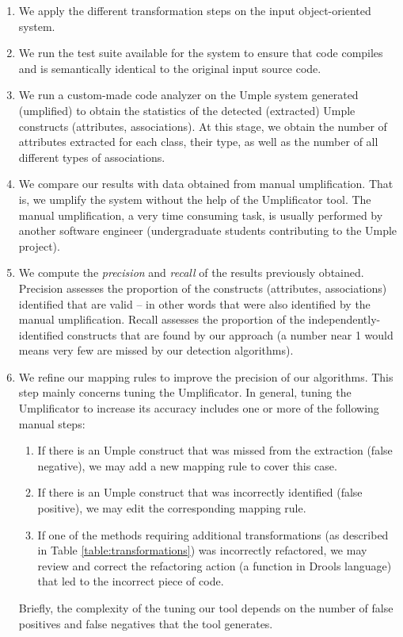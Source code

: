 \begin{enumerate}
\item We apply the different transformation steps on the input object-oriented system.

\item We run the test suite available for the system to ensure that code compiles and is semantically identical to the original input source code.

\item We run a custom-made code analyzer on the Umple system generated (umplified) to obtain the statistics of the detected (extracted) Umple constructs (attributes, associations). At this stage, we obtain the number of attributes extracted for each class, their type, as well as the number of all different types of associations.	

\item We compare our results with data obtained from manual umplification. That is, we umplify the system without the help of the Umplificator tool. The manual 	umplification, a very time consuming task, is usually performed by another software engineer (undergraduate students contributing to the Umple project). 

\item We compute the \textit{precision} and \textit{recall} of the results previously obtained. Precision assesses the proportion of the constructs (attributes, associations) identified that are valid -- in other words that were also identified by the manual umplification. Recall assesses the proportion of the independently-identified constructs that are found by our approach (a number near 1 would means very few are missed by our detection algorithms). 

\item We refine our mapping rules to improve the precision of our algorithms. This step mainly concerns tuning the Umplificator. In general, tuning the Umplificator to increase its accuracy includes one or more of the following manual steps:

	\begin{enumerate}
		\item If there is an Umple construct that was missed from the extraction (false negative), we may add a new mapping rule to cover this case.
		
		\item If there is an Umple construct that was incorrectly identified (false positive), we may edit the corresponding mapping rule.
		\item If one of the methods requiring additional transformations (as described in Table \ref{table:transformations}) was incorrectly refactored, we may review and correct the refactoring action (a function in Drools language) that led to the incorrect piece of code.

	\end{enumerate}
Briefly, the complexity of the tuning our tool depends on the number of false positives and false negatives that the tool generates. 
\end{enumerate}


